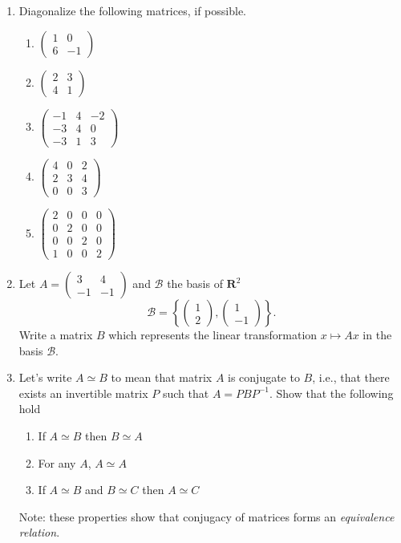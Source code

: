 \documentclass[12pt]{article}
\numberwithin{equation}{subsection}
\numberwithin{figure}{subsection}
\theoremstyle{note}
\newcommand{\R}{\mathbf{R}}
\begin{document}
\begin{enumerate}[label=\arabic*.]
	\item Diagonalize the following matrices, if possible. 
		\begin{enumerate}
			\item $\begin{pmatrix} 1 & 0 \\ 6 & -1 \end{pmatrix}$	
			\item $\begin{pmatrix} 2 & 3 \\ 4 & 1 \end{pmatrix}$	
			\item $\begin{pmatrix} -1 & 4 & -2 \\ -3 & 4 & 0 \\ -3 & 1 & 3 \end{pmatrix}$	
			\item $\begin{pmatrix} 4 & 0 & 2 \\ 2 & 3 & 4 \\ 0 & 0 & 3 \end{pmatrix}$	
			\item $\begin{pmatrix} 2 & 0 & 0 & 0 \\ 0 & 2 & 0 & 0 \\ 0 & 0 & 2 & 0 \\ 1 & 0 & 0 & 2 \end{pmatrix}$	
		\end{enumerate}
	
	\item Let $A=\begin{pmatrix} 3 & 4 \\ -1 & -1\end{pmatrix}$ and $\mathcal{B}$ the basis of $\R^2$ \[\mathcal{B}=\left\{ \begin{pmatrix} 1 \\ 2 \end{pmatrix}, \begin{pmatrix} 1 \\ -1\end{pmatrix}\right\}.\] Write a matrix $B$ which represents the linear transformation $x\mapsto Ax$ in the basis $\mathcal{B}$.
	\item Let's write $A\simeq B$ to mean that matrix $A$ is conjugate to $B$, i.e., that there exists an invertible matrix $P$ such that $A=PBP^{-1}$. Show that the following hold	
	\begin{enumerate}
		\item If $A\simeq B$ then $B\simeq A$
		\item For any $A$, $A\simeq A$
		\item If $A\simeq B$ and $B\simeq C$ then $A\simeq C$
	\end{enumerate}
	Note: these properties show that conjugacy of matrices forms an \textit{equivalence relation}.
	

\end{enumerate}
\end{document}
